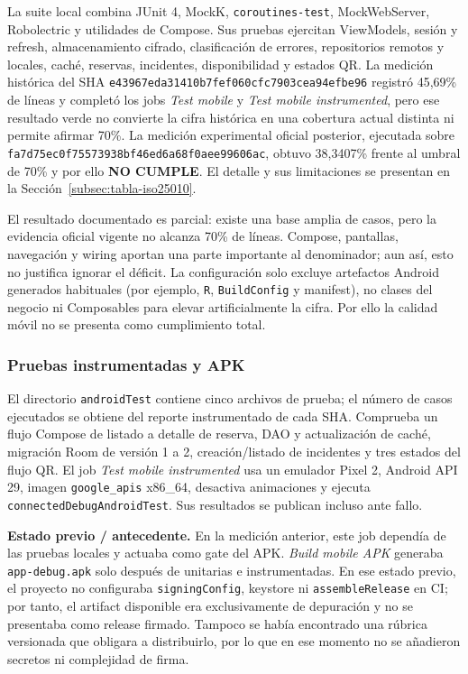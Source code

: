 La suite local combina JUnit 4, MockK, \texttt{coroutines-test}, MockWebServer,
Robolectric y utilidades de Compose. Sus pruebas ejercitan
ViewModels, sesión y refresh, almacenamiento cifrado, clasificación de errores,
repositorios remotos y locales, caché, reservas, incidentes, disponibilidad y
estados QR. La medición histórica del SHA
\texttt{e43967eda31410b7fef060cfc7903cea94efbe96} registró 45,69\% de
líneas y completó los jobs
\emph{Test mobile} y \emph{Test mobile instrumented}, pero ese resultado verde
no convierte la cifra histórica en una cobertura actual distinta ni permite
afirmar 70\%. La medición experimental oficial posterior, ejecutada sobre
\texttt{fa7d75ec0f75573938bf46ed6a68f0aee99606ac}, obtuvo 38,3407\%
frente al umbral de 70\% y por ello \textbf{NO CUMPLE}. El detalle y sus
limitaciones se presentan en la Sección~\ref{subsec:tabla-iso25010}.

El resultado documentado es parcial: existe una base amplia de casos, pero la
evidencia oficial vigente no alcanza 70\% de líneas. Compose, pantallas,
navegación y wiring
aportan una parte importante al denominador; aun así, esto no justifica ignorar
el déficit. La configuración solo excluye artefactos Android generados habituales
(por ejemplo, \texttt{R}, \texttt{BuildConfig} y manifest), no clases del
negocio ni Composables para elevar artificialmente la cifra. Por ello la calidad
móvil no se presenta como cumplimiento total.

\subsubsection{Pruebas instrumentadas y APK}

El directorio \texttt{androidTest} contiene cinco archivos de prueba; el número
de casos ejecutados se obtiene del reporte instrumentado de cada SHA.
Comprueba un flujo Compose de listado a detalle de reserva, DAO y actualización
de caché, migración Room de versión 1 a 2, creación/listado de incidentes y tres
estados del flujo QR. El job \emph{Test mobile instrumented} usa un emulador
Pixel 2, Android API 29, imagen \texttt{google\_apis} x86\_64, desactiva
animaciones y ejecuta \texttt{connectedDebugAndroidTest}. Sus resultados se
publican incluso ante fallo.

\textbf{Estado previo / antecedente.} En la medición anterior, este job dependía
de las pruebas locales y actuaba como gate del APK. \emph{Build mobile APK}
generaba \texttt{app-debug.apk} solo después de unitarias e instrumentadas. En
ese estado previo, el proyecto no configuraba \texttt{signingConfig}, keystore
ni \texttt{assembleRelease} en CI; por tanto, el artifact disponible era
exclusivamente de depuración y no se presentaba como release firmado. Tampoco se
había encontrado una rúbrica versionada que obligara a distribuirlo, por lo que
en ese momento no se añadieron secretos ni complejidad de firma.

